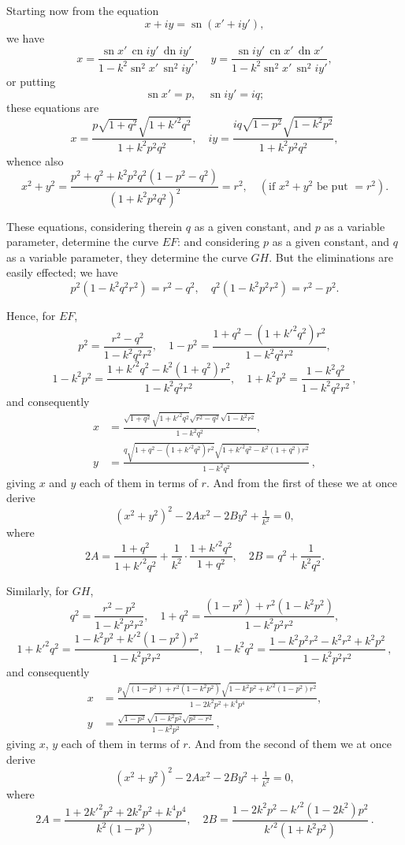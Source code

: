 \documentclass[11pt,a4paper]{article}
\DeclareMathOperator{\sn}{sn}
\DeclareMathOperator{\cn}{cn}
\DeclareMathOperator{\dn}{dn}
\begin{document}
Starting now from the equation
\[
x + iy = \sn(x' + iy'),
\]
we have
\[
x = \frac{\sn x'\,\cn iy'\,\dn iy'}{1 - k^2\sn^2 x'\,\sn^2 iy'},\quad y = \frac{\sn iy'\,\cn x'\,\dn x'}{1 - k^2\sn^2 x'\,\sn^2 iy'},
\]
or putting
\[
\sn x' = p,\quad \sn iy' = iq;
\]
these equations are
\[
x = \frac{p\sqrt{1+q^2}\sqrt{1+k'^2 q^2}}{1+k^2 p^2 q^2},\quad iy = \frac{iq\sqrt{1-p^2}\sqrt{1-k^2 p^2}}{1+k^2 p^2 q^2},
\]
whence also
\[
x^2 + y^2 = \frac{p^2 + q^2 + k^2 p^2 q^2(1-p^2-q^2)}{(1+k^2 p^2 q^2)^2} = r^2,\quad (\text{if }x^2 + y^2\text{ be put }= r^2).
\]

These equations, considering therein $q$ as a given constant, and $p$ as a variable parameter, determine the curve $EF$: and considering $p$ as a given constant, and $q$ as a variable parameter, they determine the curve $GH$. But the eliminations are easily effected; we have
\[
p^2(1 - k^2 q^2 r^2) = r^2 - q^2,\quad q^2(1 - k^2 p^2 r^2) = r^2 - p^2.
\]

Hence, for $EF$,
\[
p^2 = \frac{r^2 - q^2}{1 - k^2 q^2 r^2},\quad 1 - p^2 = \frac{1 + q^2 - (1 + k'^2 q^2) r^2}{1 - k^2 q^2 r^2},
\]
\[
1 - k^2 p^2 = \frac{1 + k'^2 q^2 - k^2(1 + q^2) r^2}{1 - k^2 q^2 r^2},\quad 1 + k^2 p^2 = \frac{1 - k^2 q^2}{1 - k^2 q^2 r^2}\,,
\]
and consequently
\begin{align*}
x &= \frac{\sqrt{1+q^2}\sqrt{1+k'^2 q^2}\sqrt{r^2-q^2}\sqrt{1-k^2 r^2}}{1 - k^2 q^2},\\
y &= \frac{q\sqrt{1+q^2-(1+k'^2 q^2)r^2}\sqrt{1+k'^2 q^2-k^2(1+q^2)r^2}}{1 - k^2 q^2}\,,
\end{align*}
giving $x$ and $y$ each of them in terms of $r$. And from the first of these we at once derive
\[
(x^2 + y^2)^2 - 2Ax^2 - 2By^2 + \tfrac{1}{k^2} = 0,
\]
where
\[
2A = \frac{1+q^2}{1+k'^2 q^2} + \frac{1}{k^2}\cdot\frac{1+k'^2 q^2}{1+q^2},\quad 2B = q^2 + \frac{1}{k^2 q^2}.
\]

Similarly, for $GH$,
\[
q^2 = \frac{r^2 - p^2}{1 - k^2 p^2 r^2},\quad 1 + q^2 = \frac{(1 - p^2) + r^2(1 - k^2 p^2)}{1 - k^2 p^2 r^2},
\]
\[
1 + k'^2 q^2 = \frac{1 - k^2 p^2 + k'^2(1 - p^2) r^2}{1 - k^2 p^2 r^2},\quad 1 - k^2 q^2 = \frac{1 - k^2 p^2 r^2 - k^2 r^2 + k^2 p^2}{1 - k^2 p^2 r^2}\,,
\]
and consequently
\begin{align*}
x &= \frac{p\sqrt{(1 - p^2) + r^2(1 - k^2 p^2)}\sqrt{1 - k^2 p^2 + k'^2(1 - p^2) r^2}}{1 - 2 k^2 p^2 + k^4 p^4},\\
y &= \frac{\sqrt{1 - p^2}\sqrt{1 - k^2 p^2}\sqrt{p^2 - r^2}}{1 - k^2 p^2}\,,
\end{align*}
giving $x$, $y$ each of them in terms of $r$. And from the second of them we at once derive
\[
(x^2 + y^2)^2 - 2Ax^2 - 2By^2 + \tfrac{1}{k^2} = 0,
\]
where
\[
2A = \frac{1 + 2 k'^2 p^2 + 2 k^2 p^2 + k^4 p^4}{k^2(1 - p^2)},\quad 2B = \frac{1 - 2 k^2 p^2 - k'^2(1 - 2 k^2)p^2}{k'^2(1 + k^2 p^2)}\,.
\]
\end{document}
